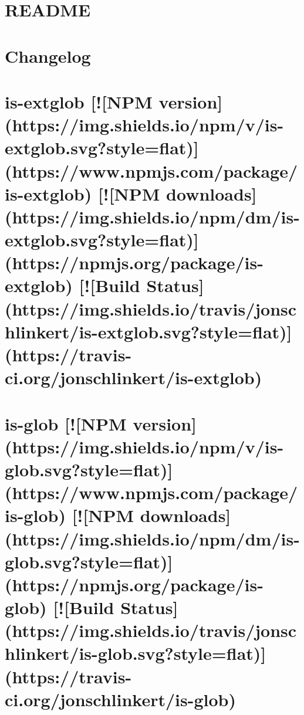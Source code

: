 \documentclass[twoside]{book}
\newcommand{\+}{\discretionary{\mbox{\scriptsize$\hookleftarrow$}}{}{}}
\begin{document}
\chapter{R\+E\+A\+D\+ME}
\label{md__c_1_workspace_demo_src_main_script_node_modules_http-proxy__r_e_a_d_m_e}

\chapter{Changelog}
\label{md__c_1_workspace_demo_src_main_script_node_modules_http-proxy-middleware__c_h_a_n_g_e_l_o_g}

\chapter{is-\/extglob \mbox{[}!\mbox{[}N\+PM version\mbox{]}(https\+://img.shields.\+io/npm/v/is-\/extglob.svg?style=flat)\mbox{]}(https\+://www.npmjs.\+com/package/is-\/extglob) \mbox{[}!\mbox{[}N\+PM downloads\mbox{]}(https\+://img.shields.\+io/npm/dm/is-\/extglob.svg?style=flat)\mbox{]}(https\+://npmjs.org/package/is-\/extglob) \mbox{[}!\mbox{[}Build Status\mbox{]}(https\+://img.shields.\+io/travis/jonschlinkert/is-\/extglob.svg?style=flat)\mbox{]}(https\+://travis-\/ci.org/jonschlinkert/is-\/extglob)}
\label{md__c_1_workspace_demo_src_main_script_node_modules_http-proxy-middleware_node_modules_is-extglob__r_e_a_d_m_e}

\chapter{is-\/glob \mbox{[}!\mbox{[}N\+PM version\mbox{]}(https\+://img.shields.\+io/npm/v/is-\/glob.svg?style=flat)\mbox{]}(https\+://www.npmjs.\+com/package/is-\/glob) \mbox{[}!\mbox{[}N\+PM downloads\mbox{]}(https\+://img.shields.\+io/npm/dm/is-\/glob.svg?style=flat)\mbox{]}(https\+://npmjs.org/package/is-\/glob) \mbox{[}!\mbox{[}Build Status\mbox{]}(https\+://img.shields.\+io/travis/jonschlinkert/is-\/glob.svg?style=flat)\mbox{]}(https\+://travis-\/ci.org/jonschlinkert/is-\/glob)}
\label{md__c_1_workspace_demo_src_main_script_node_modules_http-proxy-middleware_node_modules_is-glob__r_e_a_d_m_e}

\end{document}
